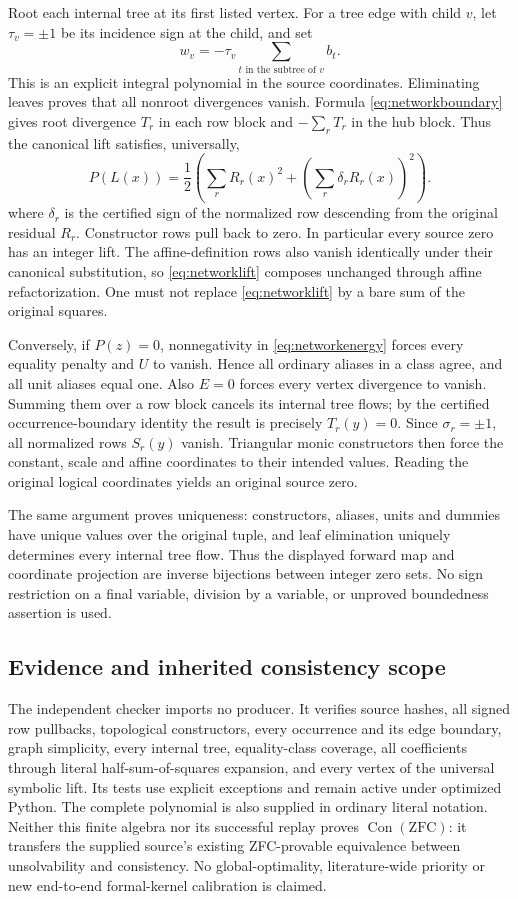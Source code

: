 Root each internal tree at its first listed vertex. For a tree edge with
child $v$, let $\tau_v=\pm1$ be its incidence sign at the child, and set
\[
 w_v=-\tau_v\sum_{t\text{ in the subtree of }v}b_t.
\]
This is an explicit integral polynomial in the source coordinates.
Eliminating leaves proves that all nonroot divergences vanish. Formula
\eqref{eq:networkboundary} gives root divergence $T_r$ in each row block and $-\sum_rT_r$ in the
hub block. Thus the canonical lift satisfies, universally,
\begin{equation}\label{eq:networklift}
 P(L(x))=\frac12\left(\sum_rR_r(x)^2+
                \left(\sum_r\delta_rR_r(x)\right)^2\right).
\end{equation}
where $\delta_r$ is the certified sign of the normalized row descending
from the original residual $R_r$. Constructor rows pull back to zero.
In particular every source zero has an integer lift. The affine-definition
rows also vanish identically under their canonical substitution, so \eqref{eq:networklift}
composes unchanged through affine refactorization. One must not replace
\eqref{eq:networklift} by a bare sum of the original squares.

Conversely, if $P(z)=0$, nonnegativity in \eqref{eq:networkenergy} forces every equality
penalty and $U$ to vanish. Hence all ordinary aliases in a class agree,
and all unit aliases equal one. Also $E=0$ forces every vertex divergence
to vanish. Summing them over a row block cancels its internal tree flows;
by the certified occurrence-boundary identity the result is precisely
$T_r(y)=0$. Since $\sigma_r=\pm1$, all normalized rows $S_r(y)$ vanish.
Triangular monic constructors then force the constant, scale and affine
coordinates to their intended values. Reading the original logical
coordinates yields an original source zero.

The same argument proves uniqueness: constructors, aliases, units and
dummies have unique values over the original tuple, and leaf elimination
uniquely determines every internal tree flow. Thus the displayed forward
map and coordinate projection are inverse bijections between integer zero
sets. No sign restriction on a final variable, division by a variable,
or unproved boundedness assertion is used.

\subsection{Evidence and inherited consistency scope}
The independent checker imports no producer. It verifies source hashes,
all signed row pullbacks, topological constructors, every occurrence and
its edge boundary, graph simplicity, every internal tree, equality-class
coverage, all coefficients through literal half-sum-of-squares expansion,
and every vertex of the universal symbolic lift. Its tests use explicit
exceptions and remain active under optimized Python. The complete
polynomial is also supplied in ordinary literal notation. Neither this
finite algebra nor its successful replay proves $\operatorname{Con}(\mathrm{ZFC})$:
it transfers the supplied source's existing ZFC-provable equivalence
between unsolvability and consistency. No global-optimality, literature-wide
priority or new end-to-end formal-kernel calibration is claimed.

